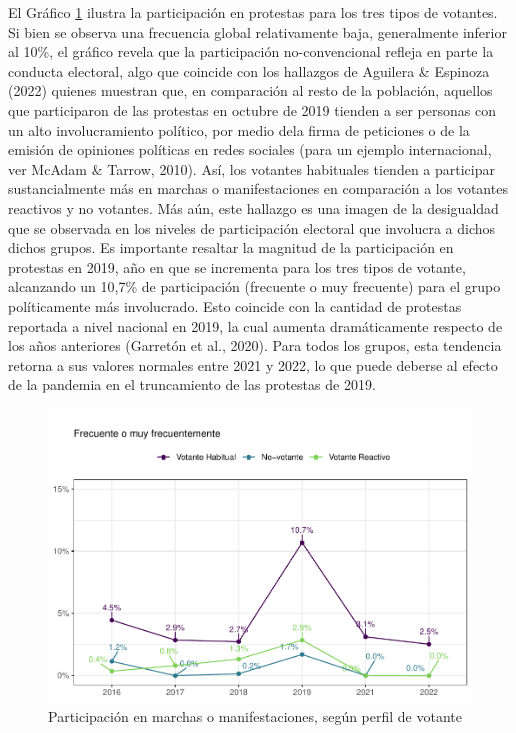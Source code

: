 \documentclass[
  12pt,
]{book}
\begin{document}
El Gráfico \ref{fig:graf-parti-mov-2} ilustra la participación en protestas para los tres tipos de votantes. Si bien se observa una frecuencia global relativamente baja, generalmente inferior al 10\%, el gráfico revela que la participación no-convencional refleja en parte la conducta electoral, algo que coincide con los hallazgos de Aguilera \& Espinoza (2022) quienes muestran que, en comparación al resto de la población, aquellos que participaron de las protestas en octubre de 2019 tienden a ser personas con un alto involucramiento político, por medio dela firma de peticiones o de la emisión de opiniones políticas en redes sociales (para un ejemplo internacional, ver McAdam \& Tarrow, 2010). Así, los votantes habituales tienden a participar sustancialmente más en marchas o manifestaciones en comparación a los votantes reactivos y no votantes. Más aún, este hallazgo es una imagen de la desigualdad que se observada en los niveles de participación electoral que involucra a dichos dichos grupos. Es importante resaltar la magnitud de la participación en protestas en 2019, año en que se incrementa para los tres tipos de votante, alcanzando un 10,7\% de participación (frecuente o muy frecuente) para el grupo políticamente más involucrado. Esto coincide con la cantidad de protestas reportada a nivel nacional en 2019, la cual aumenta dramáticamente respecto de los años anteriores (Garretón et al., 2020). Para todos los grupos, esta tendencia retorna a sus valores normales entre 2021 y 2022, lo que puede deberse al efecto de la pandemia en el truncamiento de las protestas de 2019.

\begin{figure}

{\centering \includegraphics{reporte-elsoc_files/figure-latex/graf-parti-mov-2-1} 

}

\caption{Participación en marchas o manifestaciones, según perfil de votante}\label{fig:graf-parti-mov-2}
\end{figure}
\end{document}

